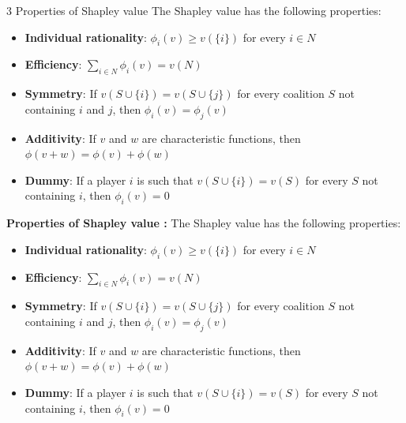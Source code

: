 \documentclass[a4paper,landscape,8pt]{article}
\newcommand{\definition}[2][]{\vspace{1pt}\noindent%
  \ifx\relax#1\relax%
    #2%
  \else%
    \textbf{#1 :} #2%
  \fi}
\begin{document}
\begin{multicols}{3}
	\definition[Properties of Shapley value]{The Shapley value has the following properties:
		\begin{itemize}[leftmargin=10pt,itemsep=0pt]
			\item \textbf{Individual rationality}: $\phi_i(v) \geq v(\{i\})$ for every $i \in N$
			\item \textbf{Efficiency}: $\sum_{i \in N} \phi_i(v) = v(N)$
			\item \textbf{Symmetry}: If $v(S \cup \{i\}) = v(S \cup \{j\})$ for every coalition $S$ not containing $i$ and $j$, then $\phi_i(v) = \phi_j(v)$
			\item \textbf{Additivity}: If $v$ and $w$ are characteristic functions, then $\phi(v + w) = \phi(v) + \phi(w)$
			\item \textbf{Dummy}: If a player $i$ is such that $v(S \cup \{i\}) = v(S)$ for every $S$ not containing $i$, then $\phi_i(v) = 0$
		\end{itemize}}
\end{multicols}
\end{document}
